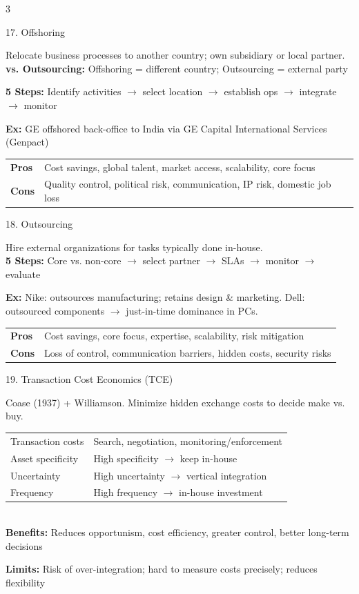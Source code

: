 \documentclass[7.5pt, letterpaper]{article}
\newcommand{\concept}[1]{%
  \vspace{2.5pt}%
  \noindent\colorbox{accent}{\parbox{\dimexpr\linewidth-2\fboxsep}{\fontsize{6.8pt}{7.5pt}\selectfont\bfseries\color{white}\strut #1\strut}}%
  \vspace{1pt}\par%
}
\newcommand{\kv}[2]{\noindent\textbf{#1:} #2\par}
\newcommand{\minitab}[1]{%
  \begingroup
  \fontsize{6.2pt}{7pt}\selectfont
  \setlength{\tabcolsep}{2pt}
  #1
  \endgroup
}
\begin{document}
\begin{multicols}{3}
\concept{17. Offshoring}
Relocate business processes to another country; own subsidiary or local partner.\\
\kv{vs. Outsourcing}{Offshoring = different country; Outsourcing = external party}
\kv{5 Steps}{Identify activities $\to$ select location $\to$ establish ops $\to$ integrate $\to$ monitor}
\kv{Ex}{GE offshored back-office to India via GE Capital International Services (Genpact)}
\minitab{\begin{tabular}{@{}ll@{}}
\textbf{Pros} & Cost savings, global talent, market access, scalability, core focus\\
\textbf{Cons} & Quality control, political risk, communication, IP risk, domestic job loss\\
\end{tabular}}

\concept{18. Outsourcing}
Hire external organizations for tasks typically done in-house.\\
\kv{5 Steps}{Core vs. non-core $\to$ select partner $\to$ SLAs $\to$ monitor $\to$ evaluate}
\kv{Ex}{Nike: outsources manufacturing; retains design \& marketing. Dell: outsourced components $\to$ just-in-time dominance in PCs.}
\minitab{\begin{tabular}{@{}ll@{}}
\textbf{Pros} & Cost savings, core focus, expertise, scalability, risk mitigation\\
\textbf{Cons} & Loss of control, communication barriers, hidden costs, security risks\\
\end{tabular}}

\concept{19. Transaction Cost Economics (TCE)}
Coase (1937) + Williamson. Minimize hidden exchange costs to decide make vs. buy.\\
\minitab{\begin{tabular}{@{}ll@{}}
Transaction costs & Search, negotiation, monitoring/enforcement\\
Asset specificity & High specificity $\to$ keep in-house\\
Uncertainty & High uncertainty $\to$ vertical integration\\
Frequency & High frequency $\to$ in-house investment\\
\end{tabular}}\\
\kv{Benefits}{Reduces opportunism, cost efficiency, greater control, better long-term decisions}
\kv{Limits}{Risk of over-integration; hard to measure costs precisely; reduces flexibility}


\end{multicols}
\end{document}
